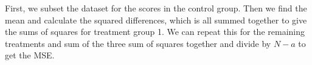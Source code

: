\documentclass[
  letterpaper,
  DIV=11,
  numbers=noendperiod,
  oneside]{scrreprt}
\newenvironment{Shaded}{\begin{snugshade}}{\end{snugshade}}
\newcommand{\CommentTok}[1]{\textcolor[rgb]{0.37,0.37,0.37}{#1}}
\newcommand{\DecValTok}[1]{\textcolor[rgb]{0.68,0.00,0.00}{#1}}
\newcommand{\FunctionTok}[1]{\textcolor[rgb]{0.28,0.35,0.67}{#1}}
\newcommand{\NormalTok}[1]{\textcolor[rgb]{0.00,0.23,0.31}{#1}}
\newcommand{\OtherTok}[1]{\textcolor[rgb]{0.00,0.23,0.31}{#1}}
\newcommand{\SpecialCharTok}[1]{\textcolor[rgb]{0.37,0.37,0.37}{#1}}
\newcommand{\StringTok}[1]{\textcolor[rgb]{0.13,0.47,0.30}{#1}}
\begin{document}
\begin{Shaded}
\end{Shaded}

First, we subset the dataset for the scores in the control group. Then
we find the mean and calculate the squared differences, which is all
summed together to give the sums of squares for treatment group 1. We
can repeat this for the remaining treatments and sum of the three sum of
squares together and divide by \(N-a\) to get the MSE.
\end{document}
